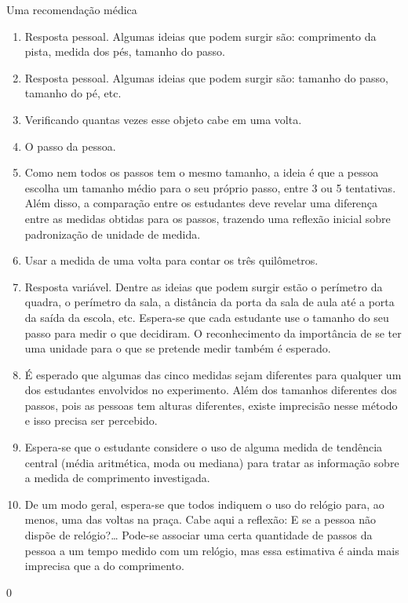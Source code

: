 \begin{answer}{Uma recomendação médica}
{
\begin{enumerate}
\item {} 
Resposta pessoal. Algumas ideias que podem surgir são: comprimento da pista, medida dos pés, tamanho do passo.

\item {} 
Resposta pessoal. Algumas ideias que podem surgir são: tamanho do passo, tamanho do pé, etc.

\item {} 
Verificando quantas vezes esse objeto cabe em uma volta.

\item {} 
O passo da pessoa.

\item {} 
Como nem todos os passos tem o mesmo tamanho, a ideia é que a pessoa escolha um tamanho médio para o seu próprio passo, entre 3 ou 5 tentativas. Além disso, a comparação entre os estudantes deve revelar uma diferença entre as medidas obtidas para os passos, trazendo uma reflexão inicial sobre padronização de unidade de medida.

\item {} 
Usar a medida de uma volta para contar os três quilômetros.

\item {} 
Resposta variável. Dentre as ideias que podem surgir estão o perímetro da quadra, o perímetro da sala, a distância da porta da sala de aula até a porta da saída da escola, etc. Espera-se que cada estudante use o tamanho do seu passo para medir o que decidiram. O reconhecimento da importância de se ter uma unidade para o que se pretende medir também é esperado.

\item {} 
É esperado que algumas das cinco medidas sejam diferentes para qualquer um dos estudantes envolvidos no experimento. Além dos tamanhos diferentes dos passos, pois as pessoas tem alturas diferentes, existe imprecisão nesse método e isso precisa ser percebido.

\item {} 
Espera-se que o estudante considere o uso de alguma medida de tendência central (média aritmética, moda ou mediana) para tratar as informação sobre a medida de comprimento investigada.

\item {} 
De um modo geral, espera-se que todos indiquem o uso do relógio para, ao menos, uma das voltas na praça. Cabe aqui a reflexão: E se a pessoa não dispõe de relógio?… Pode-se associar uma certa quantidade de passos da pessoa a um tempo medido com um relógio, mas essa estimativa é ainda mais imprecisa que a do comprimento.

\end{enumerate}
}{0}
\end{answer}
